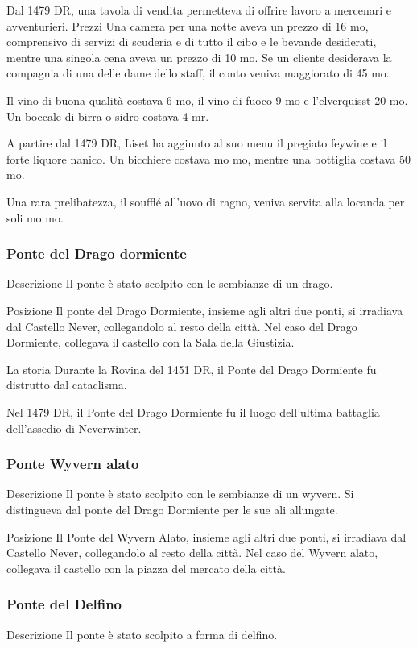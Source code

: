\documentclass{article}
\begin{document}
Dal 1479 DR, una tavola di vendita permetteva di offrire lavoro a mercenari e avventurieri.
Prezzi\newline
Una camera per una notte aveva un prezzo di 16  mo, comprensivo di servizi di scuderia e di tutto il cibo e le bevande desiderati, mentre una singola cena aveva un prezzo di 10  mo. Se un cliente desiderava la compagnia di una delle dame dello staff, il conto veniva maggiorato di 45  mo.

Il vino di buona qualità costava 6 mo, il vino di fuoco 9 mo e l'elverquisst 20 mo. Un boccale di birra o sidro costava 4 mr.

A partire dal 1479 DR, Liset ha aggiunto al suo menu il pregiato feywine e il forte liquore nanico. Un bicchiere costava mo  mo, mentre una bottiglia costava 50 mo.

Una rara prelibatezza, il soufflé all'uovo di ragno, veniva servita alla locanda per soli mo  mo.
\subsubsection{Ponte del Drago dormiente}
Descrizione
Il ponte è stato scolpito con le sembianze di un drago.

Posizione
Il ponte del Drago Dormiente, insieme agli altri due ponti, si irradiava dal Castello Never, collegandolo al resto della città. Nel caso del Drago Dormiente, collegava il castello con la Sala della Giustizia.

La storia
Durante la Rovina del 1451 DR, il Ponte del Drago Dormiente fu distrutto dal cataclisma.

Nel 1479 DR, il Ponte del Drago Dormiente fu il luogo dell'ultima battaglia dell'assedio di Neverwinter.
\subsubsection{Ponte Wyvern alato}
Descrizione
Il ponte è stato scolpito con le sembianze di un wyvern. Si distingueva dal ponte del Drago Dormiente per le sue ali allungate.

Posizione
Il Ponte del Wyvern Alato, insieme agli altri due ponti, si irradiava dal Castello Never, collegandolo al resto della città. Nel caso del Wyvern alato, collegava il castello con la piazza del mercato della città.
\subsubsection{Ponte del Delfino}
Descrizione
Il ponte è stato scolpito a forma di delfino.
\end{document}
